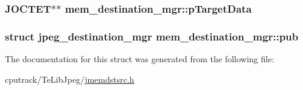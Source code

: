 \subsubsection[{\texorpdfstring{p\+Target\+Data}{pTargetData}}]{\setlength{\rightskip}{0pt plus 5cm}J\+O\+C\+T\+ET$\ast$$\ast$ mem\+\_\+destination\+\_\+mgr\+::p\+Target\+Data}\hypertarget{structmem__destination__mgr_a434f03895481594ed014e2f1f8098ba3}{}\label{structmem__destination__mgr_a434f03895481594ed014e2f1f8098ba3}
\subsubsection[{\texorpdfstring{pub}{pub}}]{\setlength{\rightskip}{0pt plus 5cm}struct jpeg\+\_\+destination\+\_\+mgr mem\+\_\+destination\+\_\+mgr\+::pub}\hypertarget{structmem__destination__mgr_a73dcb86bf4735b095cc33326a4cb0936}{}\label{structmem__destination__mgr_a73dcb86bf4735b095cc33326a4cb0936}


The documentation for this struct was generated from the following file\+:\begin{DoxyCompactItemize}
\item 
cputrack/\+Te\+Lib\+Jpeg/\hyperlink{jmemdstsrc_8h}{jmemdstsrc.\+h}\end{DoxyCompactItemize}
